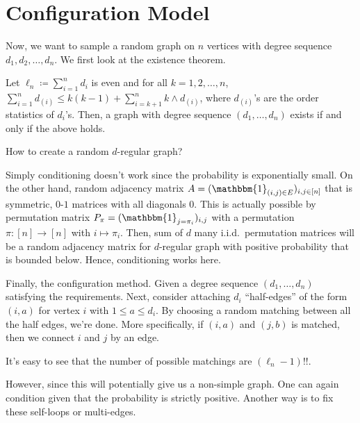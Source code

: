 \section{Configuration Model}
Now, we want to sample a random graph on \(n\) vertices with degree sequence \(d_1, d_2, \dots , d_n\). We first look at the existence theorem.

\begin{theorem}\label{thm:Erdős-Gallai}
	Let \(\ell _n \coloneqq \sum_{i=1}^{n} d_i\) is even and for all \(k = 1, 2, \dots , n\), \(\sum_{i=1}^{n} d_{(i)} \leq k(k-1) + \sum_{i=k+1}^{n} k \land d_{(i)}\), where \(d_{(i)}\)'s are the order statistics of \(d_i\)'s. Then, a graph with degree sequence \((d_1, \dots , d_n)\) exists if and only if the above holds.
\end{theorem}

\begin{problem*}
	How to create a random \(d\)-regular graph?
\end{problem*}
\begin{answer}
	Simply conditioning doesn't work since the probability is exponentially small. On the other hand, random adjacency matrix \(A = (\mathbbm{1}_{(i, j) \in E} )_{i, j \in [n]}\) that is symmetric, \(0\)-\(1\) matrices with all diagonals \(0\). This is actually possible by permutation matrix \(P_{\pi } = (\mathbbm{1}_{j = \pi _i} )_{i, j}\) with a permutation \(\pi \colon [n] \to [n]\) with \(i \mapsto \pi _i\). Then, sum of \(d\) many i.i.d.\ permutation matrices will be a random adjacency matrix for \(d\)-regular graph with positive probability that is bounded below. Hence, conditioning works here.
\end{answer}

Finally, the configuration method. Given a degree sequence \((d_1, \dots , d_n)\) satisfying the requirements. Next, consider attaching \(d_i\) ``half-edges'' of the form \((i, a)\) for vertex \(i\) with \(1 \leq a \leq d_i\). By choosing a random matching between all the half edges, we're done. More specifically, if \((i, a)\) and \((j, b)\) is matched, then we connect \(i\) and \(j\) by an edge.

\begin{note}
	It's easy to see that the number of possible matchings are \((\ell _n - 1)!!\).
\end{note}

However, since this will potentially give us a non-simple graph. One can again condition given that the probability is strictly positive. Another way is to fix these self-loops or multi-edges.

